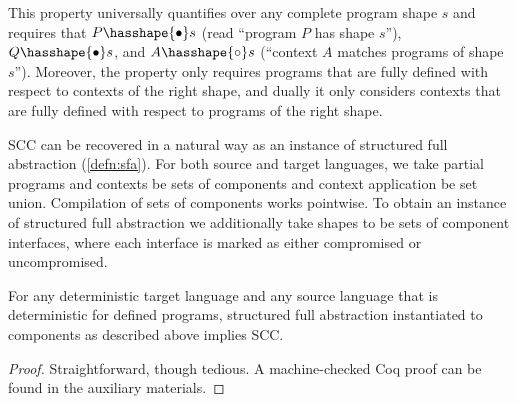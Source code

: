 \documentclass[10pt, conference, compsocconf, letterpaper, times]{IEEEtran}
\begin{document}
\noindent This property universally quantifies over any
complete program shape $s$ and requires that $P \hasshape{\bullet} s$
(read ``program $P$ has shape $s$''), $Q \hasshape{\bullet} s$, and
$A \hasshape{\circ} s$ (``context $A$ matches programs of shape
$s$'').
\iffull
{}
\fi
Moreover, the property only requires programs that are fully defined
with respect to contexts of the right shape, and dually it only
considers contexts that are fully defined with respect to programs of
the right shape.

\label{sec:recovering-scc}

SCC can be recovered in a natural
way as an instance of structured full abstraction (\autoref{defn:sfa}).
For both source and 
target languages, we take partial programs and contexts be sets of
components and context application be set union.
Compilation of sets of components works pointwise.
To obtain an instance of structured full abstraction we additionally
take shapes to be sets of component interfaces, where each interface
is marked as either compromised or uncompromised.  
\iffull {}
\fi

\iffull
{}
\fi

\ifsooner{}\fi
\begin{thm}\label{thm:sfa-to-sc}
  For any deterministic target language and any source language that
  is deterministic for defined programs, structured full abstraction
  instantiated to components as described above implies SCC.
\end{thm}
\begin{proof}
Straightforward, though tedious.  A machine-checked Coq proof can be found
in the auxiliary materials.\Coqed
\end{proof}
\end{document}
